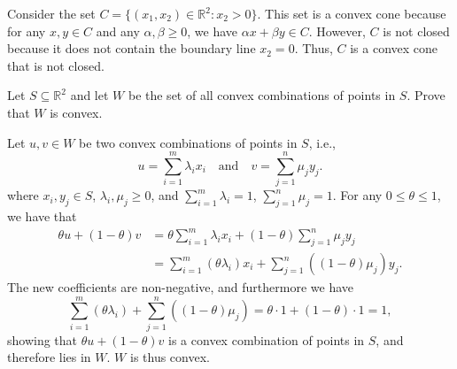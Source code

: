 \begin{solution}
  Consider the set $C = \{ (x_1, x_2) \in \mathbb{R}^2 : x_2 > 0 \}$.
  This set is a convex cone because for any $x, y \in C$ and any $\alpha, \beta \geq 0$, we have $\alpha x + \beta y \in C$.
  However, $C$ is not closed because it does not contain the boundary line $x_2 = 0$.
  Thus, $C$ is a convex cone that is not closed.
\end{solution}

\begin{exercise}
  Let $S \subseteq \mathbb{R}^2$ and let $W$ be the set of all convex combinations of points in $S$.
  Prove that $W$ is convex.
\end{exercise}

\begin{solution}
  Let $u, v \in W$ be two convex combinations of points in $S$, i.e.,
  \begin{equation}
    u = \sum_{i=1}^m \lambda_i x_i
    \quad\text{and}\quad
    v = \sum_{j=1}^n \mu_j y_j.
  \end{equation}
  where $x_i, y_j \in S$, $\lambda_i, \mu_j \geq 0$, and $\sum_{i=1}^m \lambda_i = 1$, $\sum_{j=1}^n \mu_j = 1$.
  For any $0 \leq \theta \leq 1$, we have that
  \begin{equation}
    \begin{split}
      \theta u + (1 - \theta) v
      &= \theta \sum_{i=1}^m \lambda_i x_i + (1 - \theta) \sum_{j=1}^n \mu_j y_j \\
      &= \sum_{i=1}^m (\theta \lambda_i) x_i + \sum_{j=1}^n ((1 - \theta) \mu_j) y_j.
    \end{split}
  \end{equation}
  The new coefficients are non-negative, and furthermore we have
  \begin{equation}
    \sum_{i=1}^m (\theta \lambda_i) + \sum_{j=1}^n ((1 - \theta) \mu_j)
    = \theta \cdot 1 + (1 - \theta) \cdot 1
    = 1,
  \end{equation}
  showing that $\theta u + (1 - \theta) v$ is a convex combination of points in $S$, and therefore lies in $W$.
  $W$ is thus convex.
\end{solution}